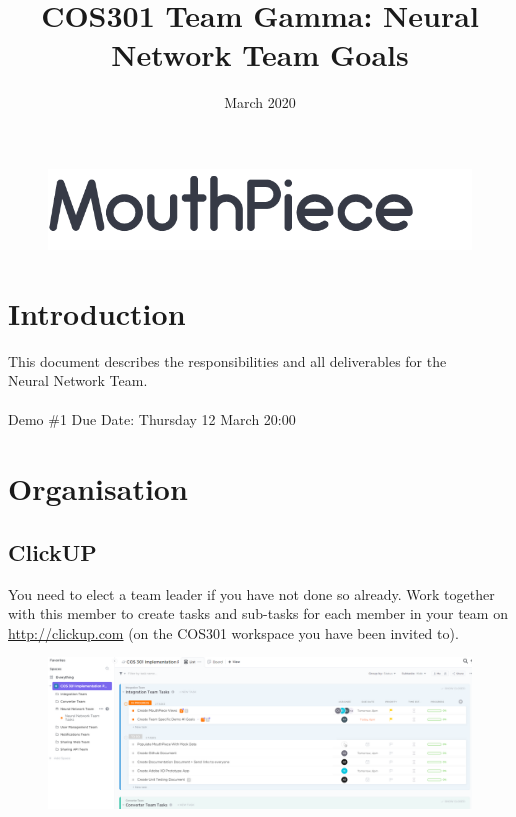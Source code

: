 \documentclass{article}
\begin{document}
\title{COS301 Team Gamma: Neural Network Team Goals}
\begin{figure}
    \centering
    \includegraphics[width=\textwidth]{logo.png}
\end{figure}
\date{March 2020}

\maketitle

\section{Introduction}
This document describes the responsibilities and all deliverables for the \\Neural Network Team.
\\ \\
Demo \#1 Due Date: Thursday 12 March 20:00
\newpage

\section{Organisation}
\subsection{ClickUP}
You need to elect a team leader if you have not done so already. Work together with this member to create tasks and sub-tasks for each member in your team on \url{http://clickup.com} (on the COS301 workspace you have been invited to). \\

\begin{figure}[h]
    \centering
    \includegraphics[width=\textwidth]{clickup.png}
\end{figure}
\end{document}
